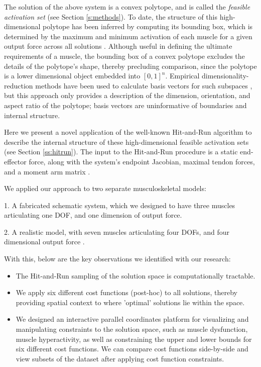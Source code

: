 The solution of the above system is a convex polytope, and is called the \emph{feasible activation set} (see Section \ref{s:methods}).
To date, the structure of this high-dimensional polytope has been inferred by computing its bounding box, which is determined by the maximum and minimum activation of each muscle for a given output force across all solutions \cite{kutch2011muscle,sohn2013cat_bounding_box,Valero-Cuevas2015high-dimensional}.
Although useful in defining the ultimate requirements of a muscle, the bounding box of a convex polytope excludes the details of the polytope's shape, thereby precluding comparison, since the polytope is a lower dimensional object embedded into $[0,1]^n$.
Empirical dimensionality-reduction methods have been used to calculate basis vectors for such subspaces \cite{Clewley2008Estimating,davella2005shared,krishnamoorthy2003muscle},
but this approach only provides a description of the dimension, orientation, and aspect ratio of the polytope; basis vectors are uninformative of boundaries and internal structure.

Here we present a novel application of the well-known Hit-and-Run algorithm \cite{smith1984efficient} to describe the internal structure of these high-dimensional feasible activation sets (see Section \ref{ss:hitrun}).
The input to the Hit-and-Run procedure is a static end-effector force, along with the system's endpoint Jacobian, maximal tendon forces, and a moment arm matrix \cite{Valero-Cuevas2009mathematical}.

We applied our approach to two separate musculoskeletal models:

1. A fabricated schematic system, which we designed to have three muscles articulating one DOF, and one dimension of output force.

2. A realistic model, with seven muscles articulating four DOFs, and four dimensional output force \cite{Valero-Cuevas1998Large}.

With this, below are the key observations we identified with our research:
\begin{itemize}
\item {The Hit-and-Run sampling of the solution space is computationally tractable.}
\item {We apply six different cost functions (post-hoc) to all solutions, thereby providing spatial context to where 'optimal' solutions lie within the space.}
\item {We designed an interactive parallel coordinates platform for visualizing and manipulating constraints to the solution space, such as muscle dysfunction, muscle hyperactivity, as well as constraining the upper and lower bounds for six different cost functions. We can compare cost functions side-by-side and view subsets of the dataset after applying cost function constraints. }
\end{itemize}

